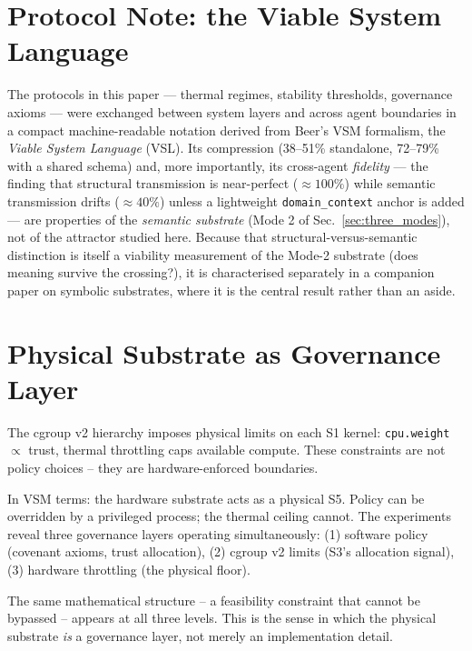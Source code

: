 \documentclass[11pt, a4paper]{article}
\begin{document}
\section{Protocol Note: the Viable System Language}
\label{sec:vsl}

The protocols in this paper --- thermal regimes, stability thresholds,
governance axioms --- were exchanged between system layers and across agent
boundaries in a compact machine-readable notation derived from Beer's VSM
formalism, the \emph{Viable System Language} (VSL). Its compression (38--51\%
standalone, 72--79\% with a shared schema) and, more importantly, its
cross-agent \emph{fidelity} --- the finding that structural transmission is
near-perfect ($\approx 100\%$) while semantic transmission drifts
($\approx 40\%$) unless a lightweight \texttt{domain\_context} anchor is added
--- are properties of the \emph{semantic substrate} (Mode 2 of
Sec.~\ref{sec:three_modes}), not of the attractor studied here. Because that
structural-versus-semantic distinction is itself a viability measurement of the
Mode-2 substrate (does meaning survive the crossing?), it is characterised
separately in a companion paper on symbolic substrates, where it is the central
result rather than an aside.


\section{Physical Substrate as Governance Layer}
\label{sec:substrate}

The cgroup v2 hierarchy imposes physical limits on each S1 kernel:
\texttt{cpu.weight} $\propto$ trust, thermal throttling caps available
compute.
These constraints are not policy choices -- they are hardware-enforced
boundaries.

In VSM terms: the hardware substrate acts as a physical S5.
Policy can be overridden by a privileged process; the thermal ceiling
cannot.
The experiments reveal three governance layers operating simultaneously:
(1) software policy (covenant axioms, trust allocation),
(2) cgroup v2 limits (S3's allocation signal),
(3) hardware throttling (the physical floor).

The same mathematical structure -- a feasibility constraint that cannot
be bypassed -- appears at all three levels.
This is the sense in which the physical substrate \emph{is} a governance
layer, not merely an implementation detail.
\end{document}
